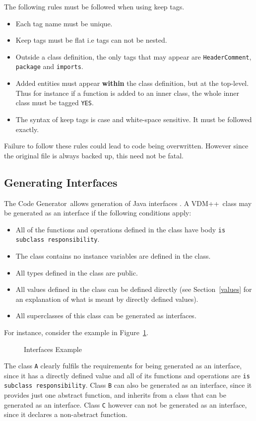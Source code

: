 \documentclass[\pformat,11pt]{article}
\newcommand{\Tcg}{The Code Generator}
\newcommand{\VDM}{VDM++}
\begin{document}
The following rules must be followed when using keep tags. 
\begin{itemize}
\item Each tag name must be unique.
\item Keep tags must be flat i.e tags can not be nested.
\item Outside a class definition, the only tags that may appear are
\texttt{HeaderComment}, \texttt{package} and \texttt{imports}. 
\item Added entities must appear \textbf{within} the class
definition, but at the top-level. Thus for instance if a function is
added to an inner class, the whole inner class must be tagged
\texttt{YES}. 
\item The syntax of keep tags is case and white-space sensitive. It
must be followed exactly.
\end{itemize}
Failure to follow these rules could lead to code being
overwritten. However since the original file is always backed up, this
need not be fatal. 


\subsection{Generating Interfaces}\label{sec:interfaces}

\Tcg\ allows generation of Java interfaces \cite{Gosling&00}. A \VDM\
class may be generated as an interface if the following conditions
apply:
\begin{itemize}
\item All of the functions and operations defined in the class have
body \texttt{is subclass responsibility}.
\item The class contains no instance variables are defined in the
class. 
\item All types defined in the class are public.
\item All values defined in the class can be defined directly (see
Section~\ref{values} for an explanation of what is meant by directly
defined values).
\item All superclasses of this class can be generated as interfaces.
\end{itemize}
For instance, consider the example in Figure~\ref{fig:interfacesex}.
\begin{figure}
\begin{quote}

\end{quote}
\caption{Interfaces Example}\label{fig:interfacesex}
\end{figure}
The class \texttt{A} clearly fulfils the requirements for being
generated as an interface, since it has a directly defined value and
all of its functions and operations are \texttt{is subclass
responsibility}. Class \texttt{B} can also be generated as an
interface, since it provides just one abstract function, and inherits
from a class that can be generated as an interface. Class \texttt{C}
however can not be generated as an interface, since it declares a
non-abstract function.
\end{document}
